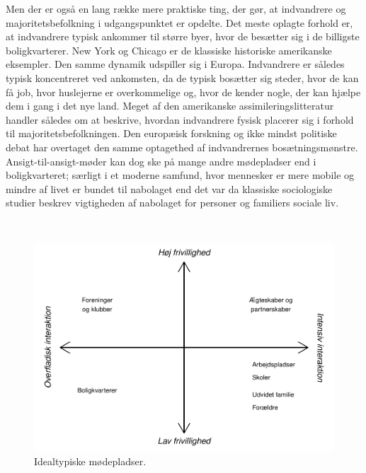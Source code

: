 \documentclass[
]{book}
\begin{document}
Men der er også en lang række mere praktiske ting, der gør, at indvandrere og majoritetsbefolkning i udgangspunktet er opdelte. Det meste oplagte forhold er, at indvandrere typisk ankommer til større byer, hvor de besætter sig i de billigste boligkvarterer. New York og Chicago er de klassiske historiske amerikanske eksempler. Den samme dynamik udspiller sig i Europa. Indvandrere er således typisk koncentreret ved ankomsten, da de typisk bosætter sig steder, hvor de kan få job, hvor huslejerne er overkommelige og, hvor de kender nogle, der kan hjælpe dem i gang i det nye land. Meget af den amerikanske assimileringslitteratur handler således om at beskrive, hvordan indvandrere fysisk placerer sig i forhold til majoritetsbefolkningen. Den europæisk forskning og ikke mindst politiske debat har overtaget den samme optagethed af indvandrernes bosætningsmønstre. Ansigt-til-ansigt-møder kan dog ske på mange andre mødepladser end i boligkvarteret; særligt i et moderne samfund, hvor mennesker er mere mobile og mindre af livet er bundet til nabolaget end det var da klassiske sociologiske studier beskrev vigtigheden af nabolaget for personer og familiers sociale liv.

~~

\begin{figure}
\includegraphics[width=1\linewidth]{en-befolkning-blander-sig_files/figure-latex/fig-1-1-1} \caption{Idealtypiske mødepladser.}\label{fig:fig-1-1}
\end{figure}

~~
\end{document}
